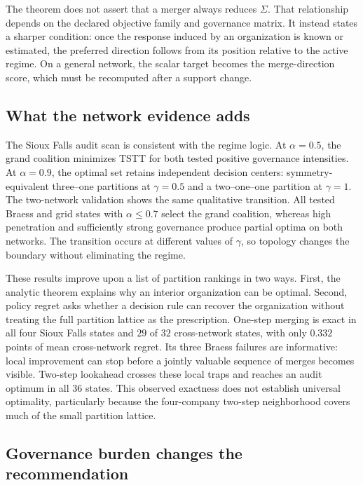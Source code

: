The theorem does not assert that a merger always reduces $\Sigma$. That
relationship depends on the declared objective family and governance matrix.
It instead states a sharper condition: once the response induced by an
organization is known or estimated, the preferred direction follows from its
position relative to the active regime. On a general network, the scalar
target becomes the merge-direction score, which must be recomputed after a
support change.

\subsection{What the network evidence adds}

The Sioux Falls audit scan is consistent with the regime logic. At
$\alpha=0.5$, the grand coalition minimizes TSTT for both tested positive
governance intensities. At $\alpha=0.9$, the optimal set retains independent
decision centers: symmetry-equivalent three--one partitions at $\gamma=0.5$
and a two--one--one partition at $\gamma=1$. The two-network validation shows
the same qualitative transition. All tested Braess and grid states with
$\alpha\leq0.7$ select the grand coalition, whereas high penetration and
sufficiently strong governance produce partial optima on both networks. The
transition occurs at different values of $\gamma$, so topology changes the
boundary without eliminating the regime.

These results improve upon a list of partition rankings in two ways. First,
the analytic theorem explains why an interior organization can be optimal.
Second, policy regret asks whether a decision rule can recover the organization
without treating the full partition lattice as the prescription. One-step
merging is exact in all four Sioux Falls states and $29$ of $32$ cross-network
states, with only $0.332$ points of mean cross-network regret. Its three Braess
failures are informative: local improvement can stop before a jointly valuable
sequence of merges becomes visible. Two-step lookahead crosses these local
traps and reaches an audit optimum in all $36$ states. This observed exactness
does not establish universal optimality, particularly because the four-company
two-step neighborhood covers much of the small partition lattice.

\subsection{Governance burden changes the recommendation}

